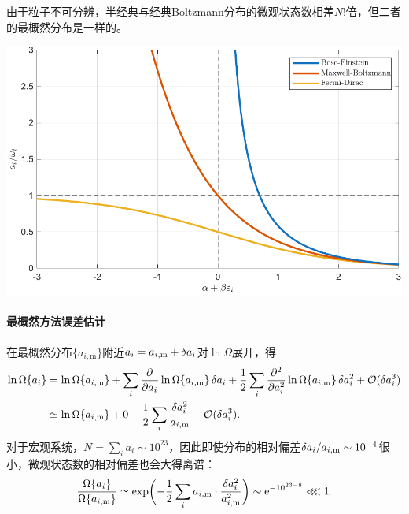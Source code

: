 
\begin{remark}
	由于粒子不可分辨，半经典与经典Boltzmann分布的微观状态数相差$N!$倍，但二者的最概然分布是一样的。
\end{remark}

\begin{center}
	\includegraphics[width=0.8\linewidth]{figures/Boltzmann_Bose_Fermi.pdf}
	\label{fig:Boltzmann Bose Fermi}
\end{center}

\paragraph{最概然方法误差估计}

\let\oldm\m
\renewcommand{\m}{\mathrm{m}}

在最概然分布$\{a_{i,\m}\}$附近$a_i=a_{i,\m}+\vd a_i$对$\ln\Omega$展开，得
\begin{align*}
	\ln\Omega\{a_i\}&=\ln\Omega\{a_{i,\m}\}+\sum_i\pp{a_i}\ln\Omega\{a_{i,\m}\}\vd a_i+\frac12\sum_i\frac{\p^2}{\p a_i^2}\ln\Omega\{a_{i,\m}\}\vd a_i^2+\bigo(\vd a_i^3)\\
	&\simeq\ln\Omega\{a_{i,\m}\}+0-\frac12\sum_i\frac{\vd a_i^2}{a_{i,\m}}+\bigo(\vd a_i^3).
\end{align*}
对于宏观系统，$N=\textstyle\sum_ia_i\sim 10^{23}$，因此即使分布的相对偏差$\vd a_i/a_{i,\m}\sim 10^{-4}$很小，微观状态数的相对偏差也会大得离谱：
\[
	\frac{\Omega\{a_i\}}{\Omega\{a_{i,\m}\}}\simeq\exp\biggkh{-\frac12\sum_ia_{i,\m}\cdot\frac{\vd a_i^2}{a_{i,\m}^2}}\sim\e{-10^{23-8}}\lll 1.
\]

\let\m\oldm

